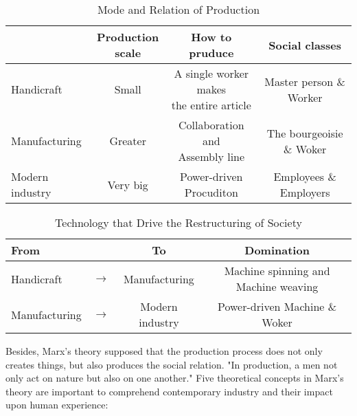 \documentclass[letterpaper,12pt]{article}
\begin{document}
\noindent
\begin{table}
    \caption{Mode and Relation of Production}
  \centering
\begin{tabular}{|l|*{3}{c|}}\hline
&\tabincell{c}{Production\\ scale}&How to pruduce& Social classes\\\hline\hline
Handicraft & Small & \tabincell{c}{A single worker makes\\ the entire article}& Master person \& Worker\\\hline
Manufacturing &Greater&\tabincell{c}{Collaboration and\\ Assembly line}& The bourgeoisie \& Woker\\\hline
Modern industry &Very big&\tabincell{c}{Power-driven\\ Procuditon} & Employees \& Employers\\\hline
\end{tabular}
\end{table}

\begin{table}
    \caption{Technology that Drive the Restructuring of Society}
  \centering
\begin{tabular}{|l|*{3}{c|}}\hline
From&&To& Domination\\\hline\hline
Handicraft & $\rightarrow$ & Manufacturing & Machine spinning and Machine weaving \\\hline
Manufacturing &$\rightarrow$&Modern industry& Power-driven Machine \& Woker\\\hline
\end{tabular}
\end{table}

Besides, Marx's theory supposed that the production process does not only creates things, 
but also produces the social relation.
"In production, a men not only act on nature but also on one another."\cite{marx1978marx}
Five theoretical concepts in Marx's theory are important to comprehend 
contemporary industry and their impact upon human experience:
\end{document}
